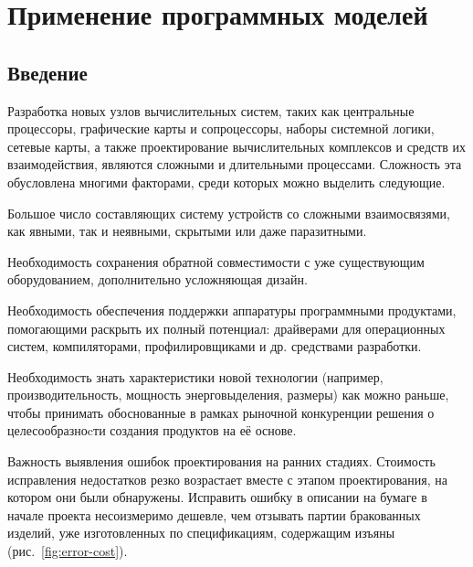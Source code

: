 \chapter{Применение программных моделей}\label{applications}


\section{Введение}

Разработка новых узлов вычислительных систем, таких как центральные процессоры, графические карты и сопроцессоры, наборы системной логики, сетевые карты, а также проектирование вычислительных комплексов и средств их взаимодействия, являются сложными и длительными процессами. Сложность эта обусловлена многими факторами, среди которых можно выделить следующие.

\begin{itemize*}
\item Большое число составляющих систему устройств со сложными взаимосвязями, как явными, так и неявными, скрытыми или даже паразитными.   

\item Необходимость сохранения обратной совместимости с уже существующим оборудованием, дополнительно усложняющая дизайн.

\item Необходимость обеспечения поддержки аппаратуры программными продуктами, помогающими раскрыть их полный потенциал: драйверами для операционных систем, компиляторами, профилировщиками и др. средствами разработки.

\item Необходимость знать характеристики новой технологии (например, производительность, мощность энерговыделения, размеры) как можно раньше, чтобы принимать обоснованные в рамках рыночной конкуренции решения о целесообразноcти создания продуктов на её основе.

\item Важность выявления ошибок проектирования на ранних стадиях. Стоимость исправления недостатков резко возрастает вместе с этапом проектирования, на котором они были обнаружены. Исправить ошибку в описании на бумаге в начале проекта несоизмеримо дешевле, чем отзывать партии бракованных изделий, уже изготовленных по спецификациям, содержащим изъяны (рис.~\ref{fig:error-cost}).

\end{itemize*}

